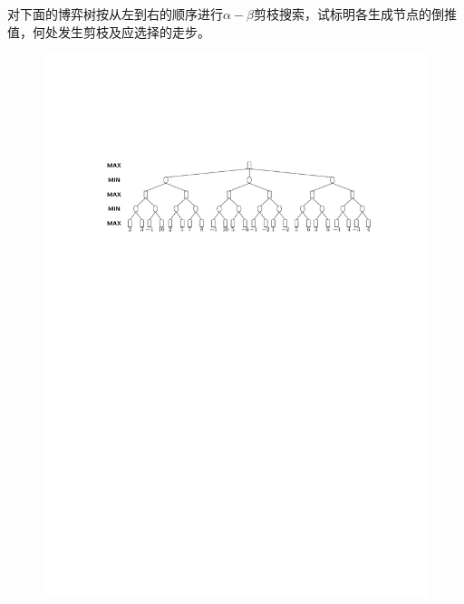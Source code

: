 \begin{example}
    对下面的博弈树按从左到右的顺序进行$\alpha-\beta$剪枝搜索，试标明各生成节点的倒推值，何处发生剪枝及应选择的走步。
    \begin{figure}[htbp]
        \centering
        \includegraphics[width = .86\textwidth]{image/alpha-beta.pdf}
    \end{figure}


\end{example}
